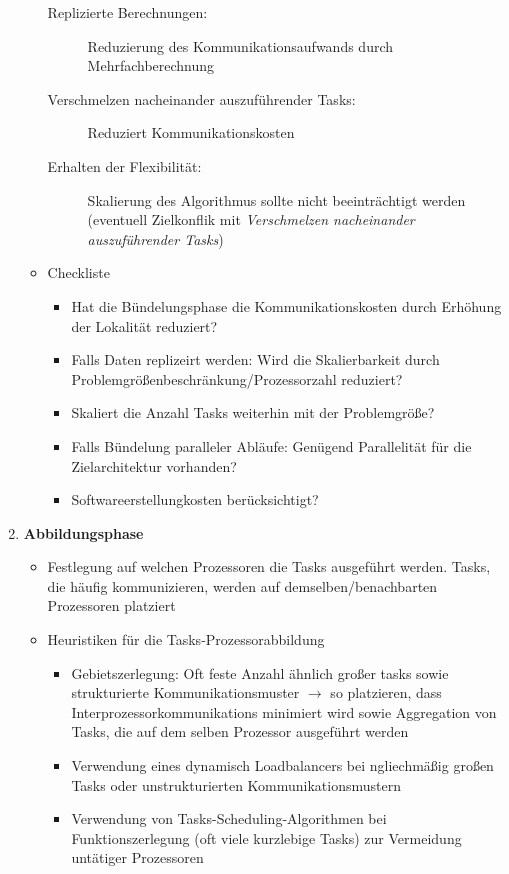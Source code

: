 \begin{enumerate}
\begin{itemize}
\begin{description}
			\item[Replizierte Berechnungen:] Reduzierung des Kommunikationsaufwands durch Mehrfachberechnung
			\item[Verschmelzen nacheinander auszuführender Tasks:] Reduziert Kommunikationskosten
			\item[Erhalten der Flexibilität:] Skalierung des Algorithmus sollte nicht beeinträchtigt werden (eventuell Zielkonflik mit \textit{Verschmelzen nacheinander auszuführender Tasks})
		\end{description}
		\item Checkliste
		\begin{itemize}
			\item Hat die Bündelungsphase die Kommunikationskosten durch Erhöhung der Lokalität reduziert?
			\item Falls Daten replizeirt werden: Wird die Skalierbarkeit durch Problemgrößenbeschränkung/Prozessorzahl reduziert?
			\item Skaliert die Anzahl Tasks weiterhin mit der Problemgröße?
			\item Falls Bündelung paralleler Abläufe: Genügend Parallelität für die Zielarchitektur vorhanden?
			\item Softwareerstellungkosten berücksichtigt?
		\end{itemize}
	\end{itemize}
	\item \textbf{Abbildungsphase}
	\begin{itemize}
		\item Festlegung auf welchen Prozessoren die Tasks ausgeführt werden. Tasks, die häufig kommunizieren, werden auf demselben/benachbarten Prozessoren platziert
		\item Heuristiken für die Tasks-Prozessorabbildung
		\begin{itemize}
			\item Gebietszerlegung: Oft feste Anzahl ähnlich großer tasks sowie strukturierte Kommunikationsmuster \(\rightarrow\) so platzieren, dass Interprozessorkommunikations minimiert wird sowie Aggregation von Tasks, die auf dem selben Prozessor ausgeführt werden
			\item Verwendung eines dynamisch Loadbalancers bei ngliechmäßig großen Tasks oder unstrukturierten Kommunikationsmustern
			\item Verwendung von Tasks-Scheduling-Algorithmen bei Funktionszerlegung (oft viele kurzlebige Tasks) zur Vermeidung untätiger Prozessoren
		\end{itemize}
	\end{itemize}
\end{enumerate}


